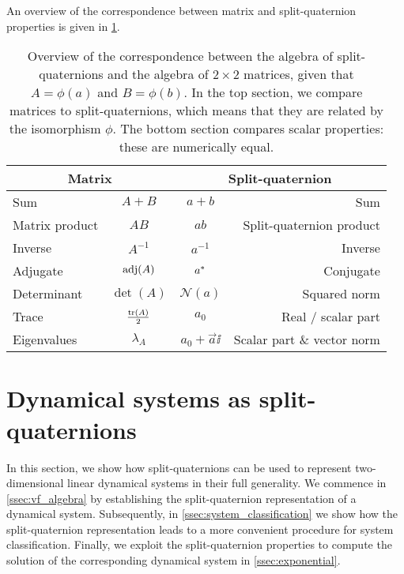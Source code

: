 An overview of the correspondence between matrix and split-quaternion properties is given in \cref{tab:spquat_matrices}.

\renewcommand{\arraystretch}{1.3}
\begin{table}[ht!]
    \centering
    \caption{Overview of the correspondence between the algebra of split-quaternions and the algebra of \(2\times2\) matrices, given that \(A = \phi(a)\) and \(B = \phi(b)\). In the top section, we compare matrices to split-quaternions, which means that they are related by the isomorphism \(\phi\). The bottom section compares scalar properties: these are numerically equal.}
    \label{tab:spquat_matrices}
    \begin{tabular}{lc|cr}
    \toprule
        \multicolumn{2}{c}{\textbf{Matrix}} & \multicolumn{2}{c}{\textbf{Split-quaternion}} \\
    \midrule
        Sum      & \( A + B \)      & \( a + b\) & Sum \\
        Matrix product  & \( AB \)  & \( ab\) & Split-quaternion product \\
        Inverse  & \(A^{-1}\)       & \(a^{-1}\) & Inverse \\
        Adjugate & \(\operatorname{adj}(A)\) & \(a^*\) & Conjugate \\
        \midrule
        Determinant & \(\det(A)\) & \(\mathscr{N}(a)\) & Squared norm \\
        Trace       & \(\frac{\trace(A)}{2}\) & \(a_0\) & Real / scalar part \\
        Eigenvalues \hspace{1.5cm} & \(\lambda_{A} \) & \( a_0 + \vec{a}\ii \) & Scalar part \& vector norm \\
    \bottomrule
    \end{tabular}
\end{table}
\renewcommand{\arraystretch}{1}

\section{Dynamical systems as split-quaternions}
\label{sec:system_classification}
In this section, we show how split-quaternions can be used to represent two-dimensional linear dynamical systems in their full generality. We commence in \cref{ssec:vf_algebra} by establishing the split-quaternion representation of a dynamical system. Subsequently, in \cref{ssec:system_classification} we show how the split-quaternion representation leads to a more convenient procedure for system classification. Finally, we exploit the split-quaternion properties to compute the solution of the corresponding dynamical system in \cref{ssec:exponential}.

